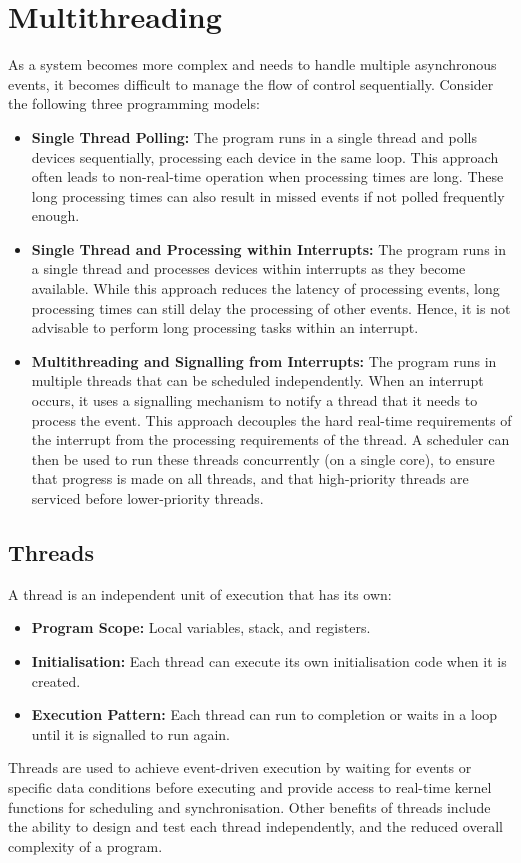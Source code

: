 \documentclass{article}
\begin{document}
\section{Multithreading}
As a system becomes more complex and needs to handle multiple
asynchronous events, it becomes difficult to manage the flow of control
sequentially. Consider the following three programming models:
\begin{itemize}
    \item \textbf{Single Thread Polling:} The program runs in a single
          thread and polls devices sequentially, processing each
          device in the same loop. This approach often leads to
          non-real-time operation when processing times are long. These
          long processing times can also result in missed events if not
          polled frequently enough.
    \item \textbf{Single Thread and Processing within Interrupts:}
          The program runs in a single thread and processes devices
          within interrupts as they become available. While this
          approach reduces the latency of processing events, long
          processing times can still delay the processing of other
          events. Hence, it is not advisable to perform long processing
          tasks within an interrupt.
    \item \textbf{Multithreading and Signalling from Interrupts:}
          The program runs in multiple threads that can be scheduled
          independently. When an interrupt occurs, it uses a signalling
          mechanism to notify a thread that it needs to process the
          event. This approach decouples the hard real-time requirements
          of the interrupt from the processing requirements of the
          thread. A scheduler can then be used to run these threads
          concurrently (on a single core), to ensure that progress is
          made on all threads, and that high-priority threads are
          serviced before lower-priority threads.
\end{itemize}
\subsection{Threads}
A thread is an independent unit of execution that has its own:
\begin{itemize}
    \item \textbf{Program Scope:} Local variables, stack, and registers.
    \item \textbf{Initialisation:} Each thread can execute its own
          initialisation code when it is created.
    \item \textbf{Execution Pattern:} Each thread can run to completion
          or waits in a loop until it is signalled to run again.
\end{itemize}
Threads are used to achieve event-driven execution by waiting for events
or specific data conditions before executing and provide access
to real-time kernel functions for scheduling and synchronisation. Other
benefits of threads include the ability to design and test each thread
independently, and the reduced overall complexity of a program.
\end{document}
